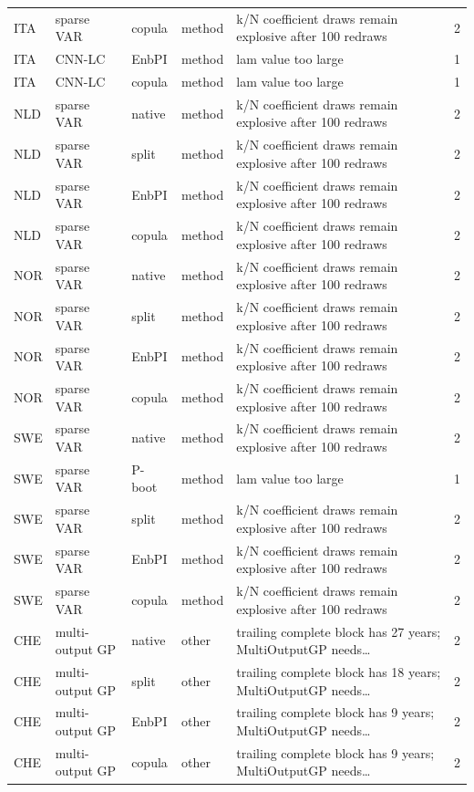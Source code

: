 {\begin{longtable}{@{}lllp{1.6cm}p{6.2cm}r@{}}
ITA & sparse VAR & copula & method & k/N coefficient draws remain explosive after 100 redraws & 2 \\
ITA & CNN-LC & EnbPI & method & lam value too large & 1 \\
ITA & CNN-LC & copula & method & lam value too large & 1 \\
NLD & sparse VAR & native & method & k/N coefficient draws remain explosive after 100 redraws & 2 \\
NLD & sparse VAR & split & method & k/N coefficient draws remain explosive after 100 redraws & 2 \\
NLD & sparse VAR & EnbPI & method & k/N coefficient draws remain explosive after 100 redraws & 2 \\
NLD & sparse VAR & copula & method & k/N coefficient draws remain explosive after 100 redraws & 2 \\
NOR & sparse VAR & native & method & k/N coefficient draws remain explosive after 100 redraws & 2 \\
NOR & sparse VAR & split & method & k/N coefficient draws remain explosive after 100 redraws & 2 \\
NOR & sparse VAR & EnbPI & method & k/N coefficient draws remain explosive after 100 redraws & 2 \\
NOR & sparse VAR & copula & method & k/N coefficient draws remain explosive after 100 redraws & 2 \\
SWE & sparse VAR & native & method & k/N coefficient draws remain explosive after 100 redraws & 2 \\
SWE & sparse VAR & P-boot & method & lam value too large & 1 \\
SWE & sparse VAR & split & method & k/N coefficient draws remain explosive after 100 redraws & 2 \\
SWE & sparse VAR & EnbPI & method & k/N coefficient draws remain explosive after 100 redraws & 2 \\
SWE & sparse VAR & copula & method & k/N coefficient draws remain explosive after 100 redraws & 2 \\
CHE & multi-output GP & native & other & trailing complete block has 27 years; MultiOutputGP needs\ldots & 2 \\
CHE & multi-output GP & split & other & trailing complete block has 18 years; MultiOutputGP needs\ldots & 2 \\
CHE & multi-output GP & EnbPI & other & trailing complete block has 9 years; MultiOutputGP needs\ldots & 2 \\
CHE & multi-output GP & copula & other & trailing complete block has 9 years; MultiOutputGP needs\ldots & 2 \\

\end{longtable}}
